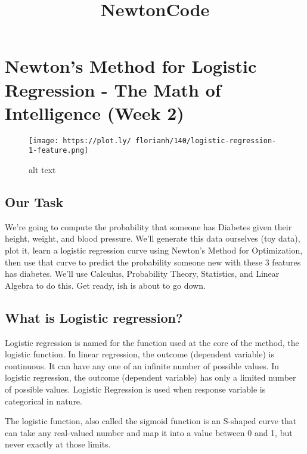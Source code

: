 \documentclass[11pt]{article}
\title{NewtonCode}
\makeatletter
\def\maxwidth{\ifdim\Gin@nat@width>\linewidth\linewidth
    \else\Gin@nat@width\fi}
\let\Oldincludegraphics\includegraphics
\renewcommand{\includegraphics}[1]{\Oldincludegraphics[width=.8\maxwidth]{#1}}
\makeatother
\begin{document}
    
    
    \maketitle
    
    

    
    \section{Newton's Method for Logistic Regression - The Math of
Intelligence (Week
2)}\label{newtons-method-for-logistic-regression---the-math-of-intelligence-week-2}

\begin{figure}
\centering
\texttt{[image: https://plot.ly/~florianh/140/logistic-regression-1-feature.png]}
\caption{alt text}
\end{figure}

\subsection{Our Task}\label{our-task}

We're going to compute the probability that someone has Diabetes given
their height, weight, and blood pressure. We'll generate this data
ourselves (toy data), plot it, learn a logistic regression curve using
Newton's Method for Optimization, then use that curve to predict the
probability someone new with these 3 features has diabetes. We'll use
Calculus, Probability Theory, Statistics, and Linear Algebra to do this.
Get ready, ish is about to go down.

\subsection{What is Logistic
regression?}\label{what-is-logistic-regression}

Logistic regression is named for the function used at the core of the
method, the logistic function. In linear regression, the outcome
(dependent variable) is continuous. It can have any one of an infinite
number of possible values. In logistic regression, the outcome
(dependent variable) has only a limited number of possible values.
Logistic Regression is used when response variable is categorical in
nature.

The logistic function, also called the sigmoid function is an S-shaped
curve that can take any real-valued number and map it into a value
between 0 and 1, but never exactly at those limits.
\end{document}

